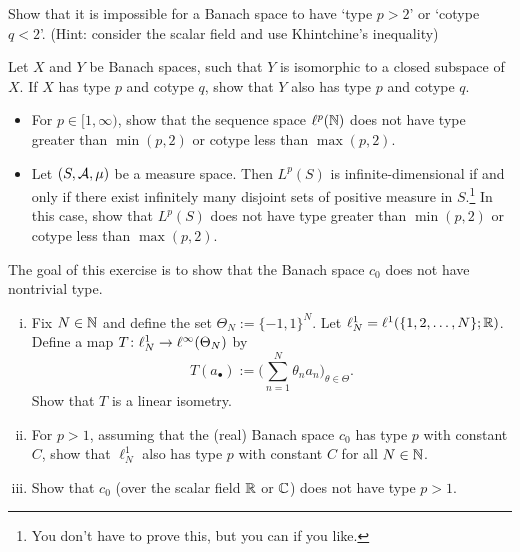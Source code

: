 \begin{exercise}\label{ex:no-extreme-types}
  Show that it is impossible for a Banach space to have `type $p > 2$' or `cotype $q < 2$'. (Hint: consider the scalar field and use Khintchine's inequality)
\end{exercise}

\begin{exercise}\label{ex:isomorphic-cotype}
  Let $X$ and $Y$ be Banach spaces, such that $Y$ is isomorphic to a closed subspace of $X$.
  If $X$ has type $p$ and cotype $q$, show that $Y$ also has type $p$ and cotype $q$.
\end{exercise}

\begin{exercise}\label{ex:Lp-optimal-type}
  \begin{itemize}
  \item
    For $p \in [1,\infty)$, show that the sequence space $\ell^{p}(\mathbb{N})$ does not have type greater than $\min(p,2)$ or cotype less than $\max(p,2)$.
  \item
    Let $(S,\mathcal{A},\mu)$ be a measure space.
    Then $L^p(S)$ is infinite-dimensional if and only if there exist infinitely many disjoint sets of positive measure in $S$.\footnote{You don't have to prove this, but you can if you like.}
    In this case, show that $L^p(S)$ does not have type greater than $\min(p,2)$ or cotype less than $\max(p,2)$.
  \end{itemize}
\end{exercise}

\begin{exercise}\label{ex:c0-notype}
  The goal of this exercise is to show that the Banach space $c_{0}$ does not have nontrivial type.
  \begin{enumerate}[(i)]
  \item Fix $N \in \mathbb{N}$ and define the set $\Theta_{N} := \{-1,1\}^{N}$.
    Let $\ell^{1}_{N} = \ell^{1}(\{1,2,\ldots,N\};\mathbb{R})$.
    Define a map $T \colon \ell^{1}_{N} \rightarrow \ell^\infty(\Theta_{N})$ by
    \begin{equation*}
      T(a_{\bullet}) := \Big( \sum_{n=1}^{N} \theta_{n} a_{n}\Big)_{\theta \in \Theta}.
    \end{equation*}
    Show that $T$ is a linear isometry.

  \item For $p > 1$, assuming that the (real) Banach space $c_{0}$ has type $p$ with constant $C$, show that $\ell^{1}_{N}$ also has type $p$ with constant $C$ for all $N \in \mathbb{N}$.

  \item Show that $c_{0}$ (over the scalar field $\mathbb{R}$ or $\mathbb{C}$) does not have type $p > 1$.
  \end{enumerate}
\end{exercise}

